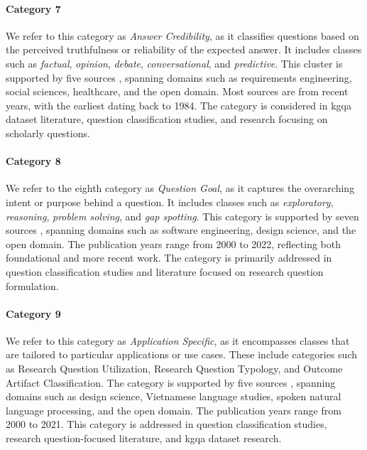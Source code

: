 \label{enum:cluster_7}
\paragraph{Category 7} We refer to this category as \emph{Answer Credibility}, as it classifies questions based on the perceived truthfulness or reliability of the expected answer. It includes classes such as \emph{factual}, \emph{opinion}, \emph{debate}, \emph{conversational}, and \emph{predictive}. This cluster is supported by five sources \cite{karras_divide_2023,bolotova_non-factoid_2022,liu_taxonomy_2015,dillon_classification_1984,kamper_types_2020}, spanning domains such as requirements engineering, social sciences, healthcare, and the open domain. Most sources are from recent years, with the earliest dating back to 1984. The category is considered in \gls{kgqa} dataset literature, question classification studies, and research focusing on scholarly questions.

\label{enum:cluster_8}
\paragraph{Category 8} We refer to the eighth category as \emph{Question Goal}, as it captures the overarching intent or purpose behind a question. It includes classes such as \emph{exploratory}, \emph{reasoning}, \emph{problem solving}, and \emph{gap spotting}. This category is supported by seven sources \cite{easterbrook_selecting_2008,thuan_construction_2019,ratan_formulation_2019,shaw_writing_2003,bolotova_non-factoid_2022,moldovan_structure_2000,allam_question_2016}, spanning domains such as software engineering, design science, and the open domain. The publication years range from 2000 to 2022, reflecting both foundational and more recent work. The category is primarily addressed in question classification studies and literature focused on research question formulation.

\label{enum:cluster_9}
\paragraph{Category 9} We refer to this category as \emph{Application Specific}, as it encompasses classes that are tailored to particular applications or use cases. These include categories such as Research Question Utilization, Research Question Typology, and Outcome Artifact Classification. The category is supported by five sources \cite{thuan_construction_2019,nguyen_ripple_2017,chernov_linguistically_2015,moldovan_structure_2000,steinmetz_what_2021}, spanning domains such as design science, Vietnamese language studies, spoken natural language processing, and the open domain. The publication years range from 2000 to 2021. This category is addressed in question classification studies, research question-focused literature, and \gls{kgqa} dataset research.